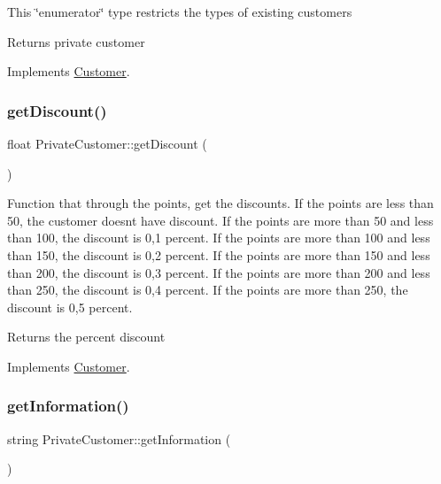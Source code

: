 This \char`\"{}enumerator\char`\"{} type restricts the types of existing customers \begin{DoxyReturn}{Returns}
private customer 
\end{DoxyReturn}


Implements \hyperlink{classCustomer_a0353fcbdcb8ec729d95e9086df828e34}{Customer}.

\hypertarget{classPrivateCustomer_a4757f4e3cb5e0e74891e8f1b37a07277}{}\label{classPrivateCustomer_a4757f4e3cb5e0e74891e8f1b37a07277} 
\subsubsection{\texorpdfstring{get\+Discount()}{getDiscount()}}
{\footnotesize\ttfamily float Private\+Customer\+::get\+Discount (\begin{DoxyParamCaption}{ }\end{DoxyParamCaption})\hspace{0.3cm}{\ttfamily [virtual]}}

Function that through the points, get the discounts. If the points are less than 50, the customer doesn\textquotesingle{}t have discount. If the points are more than 50 and less than 100, the discount is 0,1 percent. If the points are more than 100 and less than 150, the discount is 0,2 percent. If the points are more than 150 and less than 200, the discount is 0,3 percent. If the points are more than 200 and less than 250, the discount is 0,4 percent. If the points are more than 250, the discount is 0,5 percent. \begin{DoxyReturn}{Returns}
the percent discount 
\end{DoxyReturn}


Implements \hyperlink{classCustomer_a55df4714c5be2c2978069eda6bc32ace}{Customer}.

\hypertarget{classPrivateCustomer_afcf22c4a25e9c961d045aa5a0d8d9fd2}{}\label{classPrivateCustomer_afcf22c4a25e9c961d045aa5a0d8d9fd2} 
\subsubsection{\texorpdfstring{get\+Information()}{getInformation()}}
{\footnotesize\ttfamily string Private\+Customer\+::get\+Information (\begin{DoxyParamCaption}{ }\end{DoxyParamCaption})\hspace{0.3cm}{\ttfamily [virtual]}}

